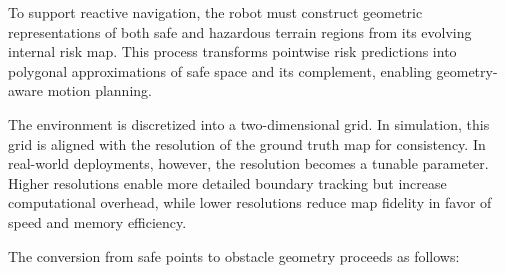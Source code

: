To support reactive navigation, the robot must construct geometric representations of both safe and hazardous terrain regions from its evolving internal risk map. This process transforms pointwise risk predictions into polygonal approximations of safe space and its complement, enabling geometry-aware motion planning.

The environment is discretized into a two-dimensional grid. In simulation, this grid is aligned with the resolution of the ground truth map for consistency. In real-world deployments, however, the resolution becomes a tunable parameter. Higher resolutions enable more detailed boundary tracking but increase computational overhead, while lower resolutions reduce map fidelity in favor of speed and memory efficiency.

The conversion from safe points to obstacle geometry proceeds as follows:

